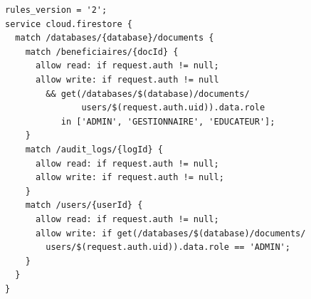 \documentclass[12pt,a4paper,openany]{report}
\begin{document}
\begin{verbatim}
rules_version = '2';
service cloud.firestore {
  match /databases/{database}/documents {
    match /beneficiaires/{docId} {
      allow read: if request.auth != null;
      allow write: if request.auth != null
        && get(/databases/$(database)/documents/
               users/$(request.auth.uid)).data.role
           in ['ADMIN', 'GESTIONNAIRE', 'EDUCATEUR'];
    }
    match /audit_logs/{logId} {
      allow read: if request.auth != null;
      allow write: if request.auth != null;
    }
    match /users/{userId} {
      allow read: if request.auth != null;
      allow write: if get(/databases/$(database)/documents/
        users/$(request.auth.uid)).data.role == 'ADMIN';
    }
  }
}
\end{verbatim}
\end{document}
